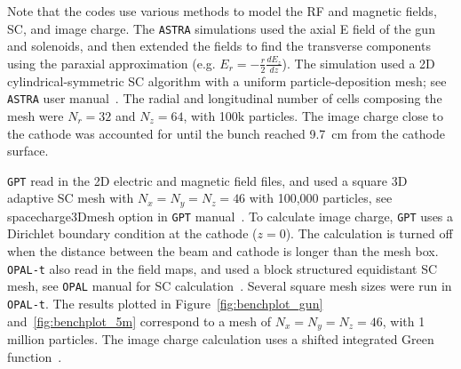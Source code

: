 Note that the codes use various methods to model 
the RF and magnetic fields, SC, and image charge. 
The \verb|ASTRA| simulations used the axial E field of the  
gun and solenoids, and then extended the fields to find the
transverse components using the paraxial approximation 
(e.g. $E_r=-\frac{r}{2}\frac{dE_z}{dz}$). 
The simulation used a 2D cylindrical-symmetric SC algorithm with a uniform  
particle-deposition mesh; see \verb|ASTRA| user manual~\cite{astra}.
The radial and longitudinal number of cells composing the mesh 
were $N_r=32$ and $N_z=64$, with 100k particles.  
The image charge close to the cathode was accounted for until 
the bunch reached \SI{9.7}{cm} from the cathode surface. 

\verb|GPT| read in the 2D electric and magnetic field files,  
and used a square 3D adaptive SC mesh with $N_x=N_y=N_z=46$
with 100,000 particles, see spacecharge3Dmesh option in \verb|GPT| manual~\cite{gpt}.
To calculate image charge, \verb|GPT| uses a Dirichlet boundary condition at the  
cathode ($z=0$). The calculation is turned off when the  
distance between the beam and cathode is longer than the 
mesh box. \verb|OPAL-t| also read in the field maps, and used a block 
structured equidistant SC mesh, see \verb|OPAL| manual for SC calculation~\cite{opal}.  
Several square mesh sizes were run in \verb|OPAL-t|. The results plotted in 
Figure~\ref{fig:benchplot_gun} and~\ref{fig:benchplot_5m} 
correspond to a mesh of $N_x=N_y=N_z=46$, with 1 million particles. 
The image charge calculation uses a 
shifted integrated Green function~\cite{imagecharge}.  
